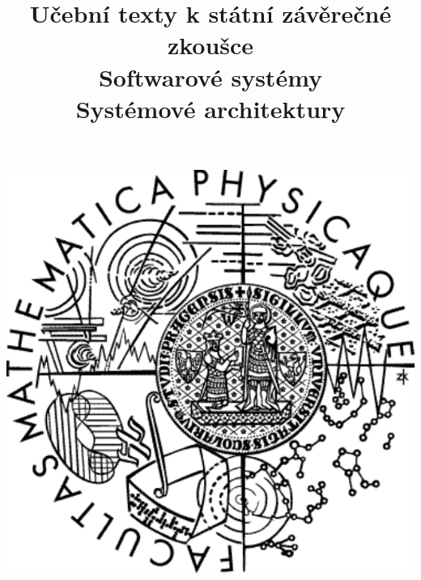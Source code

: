 \clearpage

\clearpage

\title{\LARGE Učební texty k státní závěrečné zkoušce \\ Softwarové systémy \\ Systémové architektury}




\maketitle

\vspace{10mm}
\begin{center}
\includegraphics[scale=0.5]{../common/logo.pdf}
\end{center} 

\clearpage

\clearpage

\tableofcontents





